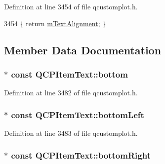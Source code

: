 Definition at line 3454 of file qcustomplot.\+h.


\begin{DoxyCode}
3454 \{ \textcolor{keywordflow}{return} \hyperlink{class_q_c_p_item_text_acdb2e50c38e83da00f083771efbd213f}{mTextAlignment}; \}
\end{DoxyCode}


\subsection{Member Data Documentation}
\hypertarget{class_q_c_p_item_text_a94aeec080f877d3d1d0c3d8ffc10e9e6}{}
\subsubsection[{bottom}]{$\ast$ const Q\+C\+P\+Item\+Text\+::bottom}\label{class_q_c_p_item_text_a94aeec080f877d3d1d0c3d8ffc10e9e6}


Definition at line 3482 of file qcustomplot.\+h.

\hypertarget{class_q_c_p_item_text_a6a1c872ad3789ecafcaeac2066e218a0}{}
\subsubsection[{bottom\+Left}]{$\ast$ const Q\+C\+P\+Item\+Text\+::bottom\+Left}\label{class_q_c_p_item_text_a6a1c872ad3789ecafcaeac2066e218a0}


Definition at line 3483 of file qcustomplot.\+h.

\hypertarget{class_q_c_p_item_text_a8ad47045c29af43b0312f7d93bb74374}{}
\subsubsection[{bottom\+Right}]{$\ast$ const Q\+C\+P\+Item\+Text\+::bottom\+Right}\label{class_q_c_p_item_text_a8ad47045c29af43b0312f7d93bb74374}


